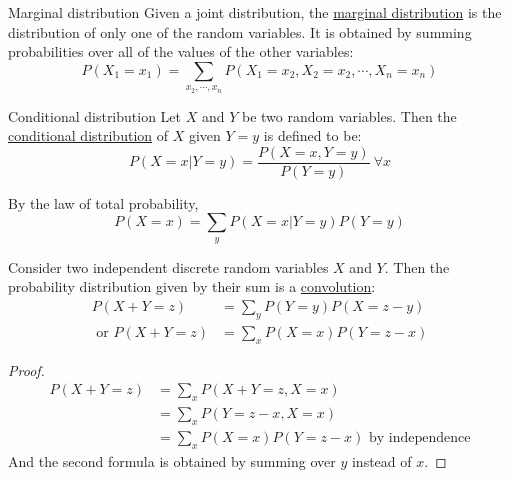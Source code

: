 \documentclass[../Main.tex]{subfiles}
\begin{document}
\begin{definition}{Marginal distribution}
    Given a joint distribution, the \underline{marginal distribution} is the distribution of only one of the random variables. It is obtained by summing probabilities over all of the values of the other variables:
    \begin{equation*}
        P(X_1 = x_1) = \sum_{x_2, \cdots, x_n} P(X_1 = x_2, X_2 = x_2, \cdots, X_n = x_n)
    \end{equation*}
\end{definition}
\begin{definition}{Conditional distribution}
    Let $X$ and $Y$ be two random variables. Then the \underline{conditional distribution} of $X$ given $Y = y$ is defined to be:
    \begin{equation*}
        P(X = x | Y = y) = \frac{P(X = x, Y = y)}{P(Y = y)}~\forall x
    \end{equation*}
\end{definition}
By the law of total probability,
\begin{equation*}
    P(X = x) = \sum_y P(X = x | Y = y) P(Y = y)
\end{equation*}
\begin{proposition}[Convolutions]
    Consider two independent discrete random variables $X$ and $Y$. Then the probability distribution given by their sum is a \underline{convolution}:
    \begin{align*}
        P(X + Y = z) &= \sum_y P(Y = y) P(X = z - y) \\
        \text{ or } P(X + Y = z) &= \sum_x P(X = x) P(Y = z - x)
    \end{align*}
\end{proposition}
\begin{proof}
    \begin{align*}
        P(X + Y = z) &= \sum_x P(X + Y = z, X = x) \\
        &= \sum_x P(Y = z - x, X = x) \\
        &= \sum_x P(X = x) P(Y = z - x) \text{ by independence}
    \end{align*}
    And the second formula is obtained by summing over $y$ instead of $x$.
\end{proof}
\end{document}
